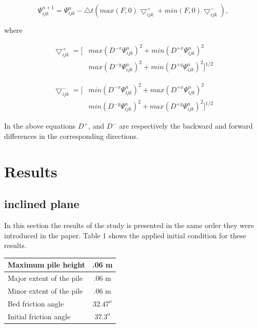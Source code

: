 \documentclass[letterpaper,10pt]{article}
\begin{document}
\begin{equation}
 \varPsi_{ijk}^{n+1}=\varPsi_{ijk}^{n}-\bigtriangleup t \left(max(F,0)\bigtriangledown_{ijk}^{+}+min(F,0)\bigtriangledown_{ijk}^{-} \right),
\end{equation}

where 

\begin{equation}
\begin{aligned}
 \bigtriangledown_{ijk}^{+} = \big[ & max(D^{-x}\varPsi_{ijk}^{n})^2 + min(D^{+x}\varPsi_{ijk}^{n})^2
 \\& max(D^{-y}\varPsi_{ijk}^{n})^2 + min(D^{+y}\varPsi_{ijk}^{n})^2 \big]^{1/2}
\end{aligned}
\end{equation}
 
\begin{equation}
\begin{aligned}
 \bigtriangledown_{ijk}^{-} = \big[ & min(D^{-x}\varPsi_{ijk}^{n})^2 + max(D^{+x}\varPsi_{ijk}^{n})^2
 \\& min(D^{-y}\varPsi_{ijk}^{n})^2 + max(D^{+y}\varPsi_{ijk}^{n})^2 \big]^{1/2}
\end{aligned}
\end{equation} 

In the above equations $D^+$, and $D^-$ are  respectively the backward and forward differences in the corresponding directions.


\section{Results} \label{results}
\subsection{inclined plane}
In this section the results of the study is presented in the same order they were introduced in the paper.
Table 1 shows the applied initial condition for these results.
\begin{center}
 
\begin{tabular}{|l|c|}

\hline
Maximum pile height       & .06 m \\
\hline
Major extent of the pile  & .06 m \\
\hline
Minor extent of the pile  & .06 m \\
\hline           
Bed friction angle        & $32.47^o$ \\
\hline
Initial friction angle    & $37.3^o$ \\
\hline
\end{tabular}
\end{center}
\end{document}
